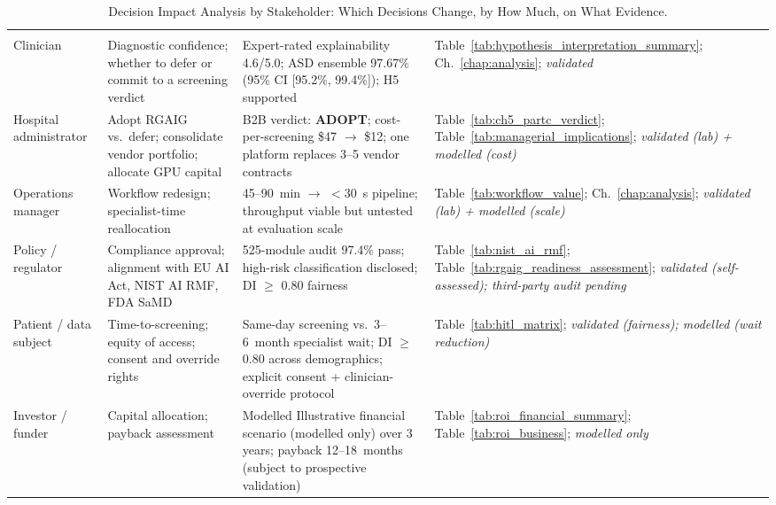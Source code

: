 {\tablestripes\tablefontsize
\begin{xltabular}{\textwidth}{@{} >{\raggedright\arraybackslash}p{2.4cm} L L >{\raggedright\arraybackslash}p{2.6cm} @{}}
\caption[Decision Impact Analysis by Stakeholder: Which Decisions]{Decision Impact Analysis by Stakeholder: Which Decisions Change, by How Much, on What Evidence.}\label{tab:decision_impact_by_stakeholder} \\
\toprule
{} &  &  &  \\
\midrule
\endfirsthead
\toprule
{} &  &  &  \\
\midrule
\endhead
\bottomrule
\endlastfoot
Clinician & Diagnostic confidence; whether to defer or commit to a screening verdict & Expert-rated explainability 4.6/5.0; ASD ensemble 97.67\% (95\% CI [95.2\%, 99.4\%]); H5 supported & Table~\ref{tab:hypothesis_interpretation_summary}; \mbox{Ch.~\ref{chap:analysis}}; \emph{validated} \\
\addlinespace
Hospital administrator & Adopt RGAIG vs.\ defer; consolidate vendor portfolio; allocate GPU capital & B2B verdict: \textbf{ADOPT}; cost-per-screening \$47 $\to$ \$12; one platform replaces 3--5 vendor contracts & Table~\ref{tab:ch5_partc_verdict}; Table~\ref{tab:managerial_implications}; \emph{validated (lab) + modelled (cost)} \\
\addlinespace
Operations manager & Workflow redesign; specialist-time reallocation & 45--90~min $\to$ $<$30~s pipeline; throughput viable but untested at evaluation scale & Table~\ref{tab:workflow_value}; \mbox{Ch.~\ref{chap:analysis}}; \emph{validated (lab) + modelled (scale)} \\
\addlinespace
Policy / regulator & Compliance approval; alignment with EU AI Act, NIST AI RMF, FDA SaMD & 525-module audit 97.4\% pass; high-risk classification disclosed; DI $\geq$ 0.80 fairness & Table~\ref{tab:nist_ai_rmf}; Table~\ref{tab:rgaig_readiness_assessment}; \emph{validated (self-assessed); third-party audit pending} \\
\addlinespace
Patient / data subject & Time-to-screening; equity of access; consent and override rights & Same-day screening vs.\ 3--6~month specialist wait; DI $\geq$ 0.80 across demographics; explicit consent + clinician-override protocol & Table~\ref{tab:hitl_matrix}; \emph{validated (fairness); modelled (wait reduction)} \\
\addlinespace
Investor / funder & Capital allocation; payback assessment & Modelled Illustrative financial scenario (modelled only) over 3 years; payback 12--18~months (subject to prospective validation) & Table~\ref{tab:roi_financial_summary}; Table~\ref{tab:roi_business}; \emph{modelled only} \\
\end{xltabular}}
